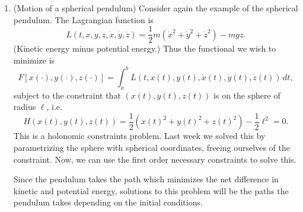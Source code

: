 \documentclass[11pt]{article}
\begin{document}
\begin{enumerate}
\item
(Motion of a spherical pendulum) Consider again the example of the spherical pendulum. The Lagrangian function is
\[
L(t, x,y,z, \dot{x}, \dot{y}, \dot{z}) = \frac{1}{2} m (\dot{x}^2 + \dot{y}^2 + \dot{z}^2) - mgz.
\]
(Kinetic energy minus potential energy.) Thus the functional we wish to minimize is
\[
F[x(\cdot), y(\cdot), z(\cdot)] = \int_a^b L(t, x(t), y(t), \dot{x}(t), \dot{y}(t), \dot{z}(t)) \, dt,
\]
subject to the constraint that $(x(t), y(t), z(t))$ is on the sphere of radius $\ell$, i.e.
\[
H(x(t), y(t), z(t)) = \frac{1}{2}(x(t)^2 + y(t)^2 + z(t)^2) - \frac{1}{2} \ell^2 = 0.
\]
This is a holonomic constraints problem. Last week we solved this by parametrizing the sphere with spherical coordinates, freeing ourselves of the constraint. Now, we can use the first order necessary constraints to solve this. 

Since the pendulum takes the path which minimizes the net difference in kinetic and potential energy, solutions to this problem will be the paths the pendulum takes depending on the initial conditions. 


\end{enumerate}
\end{document}
